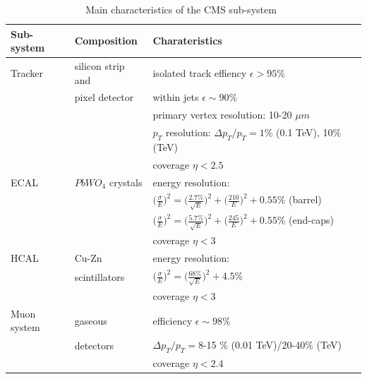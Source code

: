 \begin{table}
\centering
\begin{tabular}[!htbp]{l l l}
\hline
{\bf Sub-system} & {\bf Composition} & {\bf Charateristics} \\
\hline
Tracker  & silicon strip and  & isolated track effiency $\epsilon > 95\%$ \\
	& pixel detector	& within jets $\epsilon \sim 90\%$ \\
	& 	& primary vertex resolution: 10-20 $\mu m$ \\
	& 	& $p_T$ resolution: $\Delta p_T/p_T = 1\%$ (0.1 TeV), 10\% (TeV)\\
	& 	& coverage $\eta<2.5$ \\
\hline
ECAL 	& 	$PbWO_4$ crystals 	& energy resolution:\\
		& 	& $\big(\frac{\sigma}{E}\big)^2 = \big(\frac{2.7\%}{\sqrt{E}}\big)^2 + \big(\frac{210}{E}\big)^2 + 0.55\% $  (barrel)\\
		& 	& $\big(\frac{\sigma}{E}\big)^2 = \big(\frac{5.7\%}{\sqrt{E}}\big)^2 + \big(\frac{245}{E}\big)^2 + 0.55\% $  (end-caps)\\
		& 	& coverage $\eta < 3$ \\
\hline
HCAL 	& 	Cu-Zn 	& energy resolution:\\
		& 	scintillators & $\big(\frac{\sigma}{E}\big)^2 = \big(\frac{68\%}{\sqrt{E}}\big)^2 + 4.5\%$ \\
		& 	& coverage $\eta < 3$ \\
\hline
Muon system & gaseous & efficiency $\epsilon \sim 98\%$ \\
			& detectors & $\Delta p_T/p_T =$8-15 \% (0.01 TeV)/20-40\% (TeV)\\
		& 	& coverage $\eta < 2.4$ \\
\hline
\end{tabular}
\caption{Main characteristics of the CMS sub-system~\cite{JeremieThesis}}
\label{table:CMSMainChar}
\end{table}


